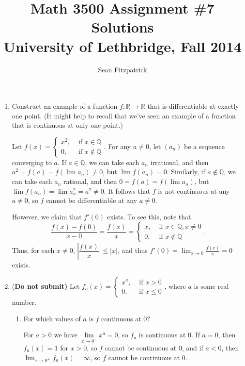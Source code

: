 \documentclass[letterpaper,12pt]{article}
\title{Math 3500 Assignment \#7 Solutions\\University of Lethbridge, Fall 2014}
\author{Sean Fitzpatrick}
\newcommand{\R}{\mathbb{R}}
\newcommand{\Q}{\mathbb{Q}}
\newcommand{\abs}[1]{\lvert #1\rvert}
\begin{document}
 \maketitle



\begin{enumerate}
 \item Construct an example of a function $f:\R\to\R$ that is differentiable at exactly one point. (It might help to recall that we've seen an example of a function that is continuous at only one point.)
 
 \bigskip
 
 Let $f(x)=\begin{cases} x^2, & \text{ if } x\in \Q\\ 0, & \text{ if } x\notin \Q\end{cases}$. For any $a\neq 0$, let $(a_n)$ be a sequence converging to $a$. If $a\in \Q$, we can take each $a_n$ irrational, and then $a^2=f(a) = f(\lim a_n)\neq 0$, but $\lim f(a_n) = 0$. Similarly, if $a\notin \Q$, we can take each $a_n$ rational, and then $0 = f(a) = f(\lim a_n)$, but $\lim f(a_n) = \lim a_n^2 = a^2\neq 0$. It follows that $f$ is not continuous at any $a\neq 0$, so $f$ cannot be differentiable at any $a\neq 0$.
 
 However, we claim that $f'(0)$ exists. To see this, note that
 \[
 \frac{f(x)-f(0)}{x-0} = \frac{f(x)}{x} = \begin{cases} x, & \text{ if } x\in \Q, x\neq 0\\ 0, & \text{ if } x\notin \Q\end{cases}.
 \]
 Thus, for each $x\neq 0$, $\left|\dfrac{f(x)}{x}\right|\leq \abs{x}$, and thus $\displaystyle f'(0)=\lim_{x\to 0}\frac{f(x)}{x}=0$ exists.
 
 \bigskip
 
 \item ({\bf Do not submit)} Let $f_a(x) = \begin{cases} x^a, & \text{ if } x> 0\\ 0, & \text{ if } x\leq 0\end{cases}$, where $a$ is some real number.
\begin{enumerate}
 \item For which values of $a$ is $f$ continuous at 0?
 
 \bigskip
 
 For $a>0$ we have $\lim\limits_{x\to 0^+}x^a = 0$, so $f_a$ is continuous at 0. If $a=0$, then $f_a(x)=1$ for $x>0$, so $f$ cannot be continuous at $0$, and if $a<0$, then $\lim_{x\to 0^+}f_a(x) = \infty$, so $f$ cannot be continuous at 0.
 

\end{enumerate}
\end{enumerate}
\end{document}

